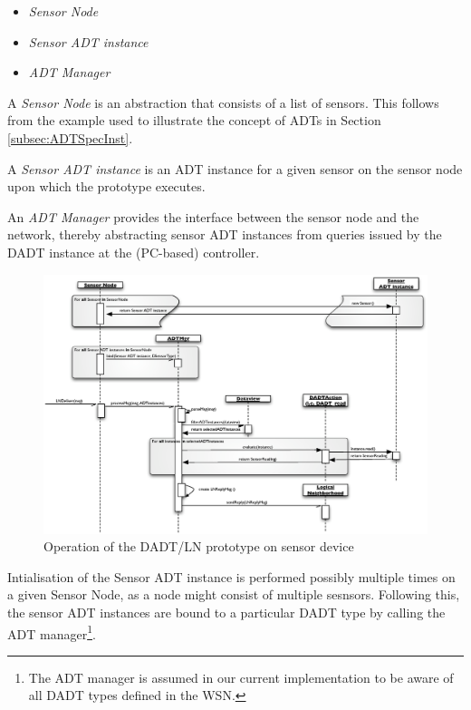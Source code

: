 \begin{itemize}
  \item \emph{Sensor Node} 
  \item \emph{Sensor ADT instance} 
  \item \emph{ADT Manager} 
\end{itemize}

A \emph{Sensor Node} is an abstraction that consists of a list of sensors. This
follows from the example used to illustrate the concept of ADTs in Section
\ref{subsec:ADTSpecInst}. 

A \emph{Sensor ADT instance} is an ADT instance for a given sensor on the sensor
node upon which the prototype executes.

An \emph{ADT Manager} provides the interface between the sensor node and the
network, thereby abstracting sensor ADT instances from queries issued by the DADT
instance at the (PC-based) controller.

\begin{figure}
\centering
\includegraphics[width=\textwidth]{img/SeqDiagram_Sensornode.eps}
\caption[Operation of the DADT/LN prototype on sensor device]{Operation of the DADT/LN prototype on sensor device}
\label{Fig:SeqDiagram_Sensornode}
\end{figure}

Intialisation of the Sensor ADT instance is performed possibly
multiple times on a given Sensor Node, as a node might consist of multiple sesnsors. Following
this, the sensor ADT instances are bound to a particular DADT type by calling
the ADT manager\footnote{The ADT manager is assumed in our
current implementation to be aware of all DADT types defined in the WSN.}.

